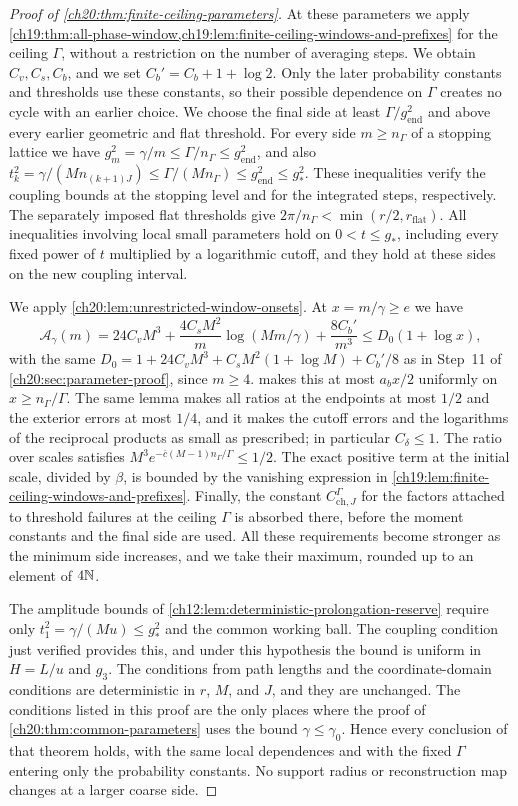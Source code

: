 \begin{proof}[Proof of \cref{ch20:thm:finite-ceiling-parameters}]
At these parameters we apply \cref{ch19:thm:all-phase-window,ch19:lem:finite-ceiling-windows-and-prefixes} for the ceiling $\Gamma$, without a restriction on the number of averaging steps. We obtain $C_v,C_s,C_b$, and we set $C_b'=C_b+1+\log2$. Only the later probability constants and thresholds use these constants, so their possible dependence on $\Gamma$ creates no cycle with an earlier choice. We choose the final side at least $\Gamma/g_{\mathrm{end}}^2$ and above every earlier geometric and flat threshold. For every side $m\ge n_\Gamma$ of a stopping lattice we have $g_m^2=\gamma/m\le\Gamma/n_\Gamma\le g_{\mathrm{end}}^2$, and also $t_k^2=\gamma/(Mn_{(k+1)J})\le\Gamma/(Mn_\Gamma)\le g_{\mathrm{end}}^2\le g_*^2$. These inequalities verify the coupling bounds at the stopping level and for the integrated steps, respectively. The separately imposed flat thresholds give $2\pi/n_\Gamma<\min(r/2,r_{\mathrm{flat}})$. All inequalities involving local small parameters hold on $0<t\le g_*$, including every fixed power of $t$ multiplied by a logarithmic cutoff, and they hold at these sides on the new coupling interval.

We apply \cref{ch20:lem:unrestricted-window-onsets}. At $x=m/\gamma\ge e$ we have
\[
 \mathcal A_\gamma(m)=24C_vM^3+\frac{4C_sM^2}{m}\log(Mm/\gamma)+\frac{8C_b'}{m^3}\le D_0(1+\log x),
\]
with the same $D_0=1+24C_vM^3+C_sM^2(1+\log M)+C_b'/8$ as in Step~11 of \cref{ch20:sec:parameter-proof}, since $m\ge4$.  makes this at most $a_bx/2$ uniformly on $x\ge n_\Gamma/\Gamma$. The same lemma makes all ratios at the endpoints at most $1/2$ and the exterior errors at most $1/4$, and it makes the cutoff errors and the logarithms of the reciprocal products as small as prescribed; in particular $C_\delta\le1$. The ratio over scales satisfies $M^3e^{-\bar c(M-1)n_\Gamma/\Gamma}\le1/2$. The exact positive term at the initial scale, divided by $\beta$, is bounded by the vanishing expression in \cref{ch19:lem:finite-ceiling-windows-and-prefixes}. Finally, the constant $C^\Gamma_{\mathrm{ch},J}$ for the factors attached to threshold failures at the ceiling $\Gamma$ is absorbed there, before the moment constants and the final side are used. All these requirements become stronger as the minimum side increases, and we take their maximum, rounded up to an element of $4\mathbb N$.

The amplitude bounds of \cref{ch12:lem:deterministic-prolongation-reserve} require only $t_1^2=\gamma/(Mu)\le g_*^2$ and the common working ball. The coupling condition just verified provides this, and under this hypothesis the bound is uniform in $H=L/u$ and $g_3$. The conditions from path lengths and the coordinate-domain conditions are deterministic in $r$, $M$, and $J$, and they are unchanged. The conditions listed in this proof are the only places where the proof of \cref{ch20:thm:common-parameters} uses the bound $\gamma\le\gamma_0$. Hence every conclusion of that theorem holds, with the same local dependences and with the fixed $\Gamma$ entering only the probability constants. No support radius or reconstruction map changes at a larger coarse side.
\end{proof}

